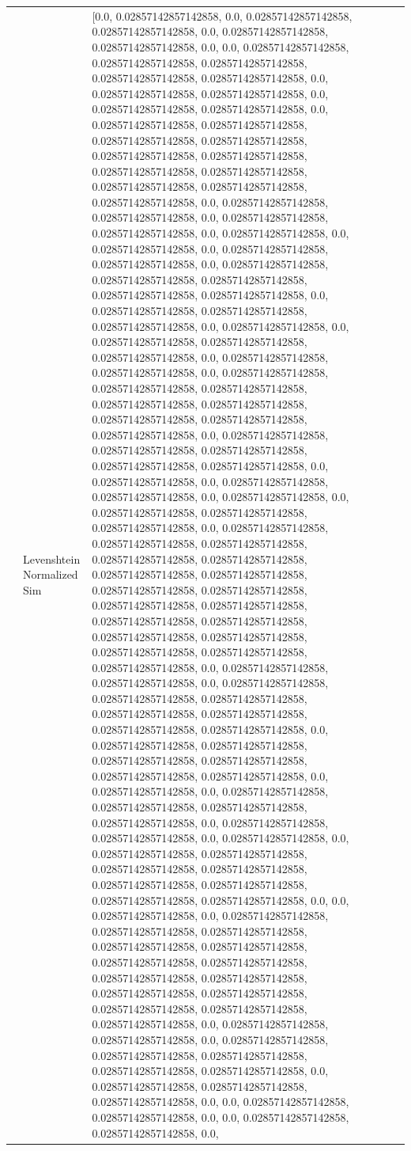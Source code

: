 \begin{tabular}{llll}
 & Levenshtein Normalized Sim & [0.0, 0.02857142857142858, 0.0, 0.02857142857142858, 0.02857142857142858, 0.0, 0.02857142857142858, 0.02857142857142858, 0.0, 0.0, 0.02857142857142858, 0.02857142857142858, 0.02857142857142858, 0.02857142857142858, 0.02857142857142858, 0.0, 0.02857142857142858, 0.02857142857142858, 0.0, 0.02857142857142858, 0.02857142857142858, 0.0, 0.02857142857142858, 0.02857142857142858, 0.02857142857142858, 0.02857142857142858, 0.02857142857142858, 0.02857142857142858, 0.02857142857142858, 0.02857142857142858, 0.02857142857142858, 0.02857142857142858, 0.02857142857142858, 0.0, 0.02857142857142858, 0.02857142857142858, 0.0, 0.02857142857142858, 0.02857142857142858, 0.0, 0.02857142857142858, 0.0, 0.02857142857142858, 0.0, 0.02857142857142858, 0.02857142857142858, 0.0, 0.02857142857142858, 0.02857142857142858, 0.02857142857142858, 0.02857142857142858, 0.02857142857142858, 0.0, 0.02857142857142858, 0.02857142857142858, 0.02857142857142858, 0.0, 0.02857142857142858, 0.0, 0.02857142857142858, 0.02857142857142858, 0.02857142857142858, 0.0, 0.02857142857142858, 0.02857142857142858, 0.0, 0.02857142857142858, 0.02857142857142858, 0.02857142857142858, 0.02857142857142858, 0.02857142857142858, 0.02857142857142858, 0.02857142857142858, 0.02857142857142858, 0.0, 0.02857142857142858, 0.02857142857142858, 0.02857142857142858, 0.02857142857142858, 0.02857142857142858, 0.0, 0.02857142857142858, 0.0, 0.02857142857142858, 0.02857142857142858, 0.0, 0.02857142857142858, 0.0, 0.02857142857142858, 0.02857142857142858, 0.02857142857142858, 0.0, 0.02857142857142858, 0.02857142857142858, 0.02857142857142858, 0.02857142857142858, 0.02857142857142858, 0.02857142857142858, 0.02857142857142858, 0.02857142857142858, 0.02857142857142858, 0.02857142857142858, 0.02857142857142858, 0.02857142857142858, 0.02857142857142858, 0.02857142857142858, 0.02857142857142858, 0.02857142857142858, 0.02857142857142858, 0.02857142857142858, 0.0, 0.02857142857142858, 0.02857142857142858, 0.0, 0.02857142857142858, 0.02857142857142858, 0.02857142857142858, 0.02857142857142858, 0.02857142857142858, 0.02857142857142858, 0.02857142857142858, 0.0, 0.02857142857142858, 0.02857142857142858, 0.02857142857142858, 0.02857142857142858, 0.02857142857142858, 0.02857142857142858, 0.0, 0.02857142857142858, 0.0, 0.02857142857142858, 0.02857142857142858, 0.02857142857142858, 0.02857142857142858, 0.0, 0.02857142857142858, 0.02857142857142858, 0.0, 0.02857142857142858, 0.0, 0.02857142857142858, 0.02857142857142858, 0.02857142857142858, 0.02857142857142858, 0.02857142857142858, 0.02857142857142858, 0.02857142857142858, 0.02857142857142858, 0.0, 0.0, 0.02857142857142858, 0.0, 0.02857142857142858, 0.02857142857142858, 0.02857142857142858, 0.02857142857142858, 0.02857142857142858, 0.02857142857142858, 0.02857142857142858, 0.02857142857142858, 0.02857142857142858, 0.02857142857142858, 0.02857142857142858, 0.02857142857142858, 0.02857142857142858, 0.02857142857142858, 0.0, 0.02857142857142858, 0.02857142857142858, 0.0, 0.02857142857142858, 0.02857142857142858, 0.02857142857142858, 0.02857142857142858, 0.02857142857142858, 0.0, 0.02857142857142858, 0.02857142857142858, 0.02857142857142858, 0.0, 0.0, 0.02857142857142858, 0.02857142857142858, 0.0, 0.0, 0.02857142857142858, 0.02857142857142858, 0.0, 
\end{tabular}
